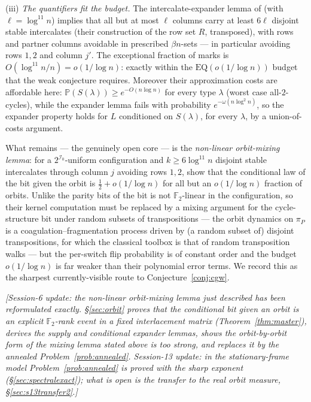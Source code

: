 \documentclass[11pt]{article}
\theoremstyle{definition}
\renewcommand{\Pr}{\mathbb{P}}
\begin{document}
(iii) \emph{The quantifiers fit the budget.}  The intercalate-expander
lemma of \cite[Lem.~8.3, Def.~8.1]{KPS25} (with $\ell=\log^{11}n$)
implies that all but at most $\ell$ columns carry at least $6\ell$
disjoint stable intercalates (their construction of the row set $R$,
transposed), with rows and partner columns avoidable in prescribed
$\beta n$-sets --- in particular avoiding rows $1,2$ and column $j'$.
The exceptional fraction of marks is $O(\log^{11}n/n)=o(1/\log n)$:
exactly within the $\mathrm{EQ}(o(1/\log n))$ budget that the weak
conjecture requires.  Moreover their approximation costs are
affordable here: $\Pr(S(\lambda))\ge e^{-O(n\log n)}$ for every type
$\lambda$ (worst case all-$2$-cycles), while the expander lemma fails
with probability $e^{-\omega(n\log^2 n)}$, so the expander property
holds for $L$ conditioned on $S(\lambda)$, for every $\lambda$, by a
union-of-costs argument.

What remains --- the genuinely open core --- is the \emph{non-linear
orbit-mixing lemma}: for a $2^{\mathcal I_0}$-uniform configuration
and $k\ge 6\log^{11}n$ disjoint stable intercalates through column $j$
avoiding rows $1,2$, show that the conditional law of the bit given
the orbit is $\tfrac12+o(1/\log n)$ for all but an $o(1/\log n)$
fraction of orbits.  Unlike the parity bits of \cite{KPS25} the bit is
not $\mathbb F_2$-linear in the configuration, so their kernel
computation must be replaced by a mixing argument for the
cycle-structure bit under random subsets of transpositions --- the
orbit dynamics on $\pi_P$ is a coagulation--fragmentation process
driven by (a random subset of) disjoint transpositions, for which the
classical toolbox is that of random transposition walks
\cite{Sch05} --- but the
per-switch flip probability is of constant order and the budget
$o(1/\log n)$ is far weaker than their polynomial error terms.  We
record this as the sharpest currently-visible route to
Conjecture~\ref{conj:cgw}.

\medskip\noindent
\emph{[Session-6 update: the non-linear orbit-mixing lemma just
described has been reformulated exactly.  \S\ref{sec:orbit} proves
that the conditional bit given an orbit is an explicit
$\mathbb{F}_2$-rank event in a fixed interlacement matrix
(Theorem~\ref{thm:master}), derives the supply and conditional
expander lemmas, shows the orbit-by-orbit form of the mixing lemma
stated above is too strong, and replaces it by the annealed
Problem~\ref{prob:annealed}.  Session-13 update: in the
stationary-frame model Problem~\ref{prob:annealed} is proved with the
sharp exponent (\S\ref{sec:spectralexact}); what is open is the
transfer to the real orbit measure, \S\ref{sec:s13transfer2}.]}
\end{document}
